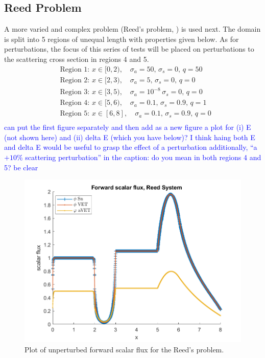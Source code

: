 \documentclass[12pt]{report}
\newcommand{\sigs}{\sigma_s}
\newcommand{\siga}{\sigma_a}
\newcommand{\comment}[2]{\marginpar{\textcolor{#2}{$\star$}}\textcolor{#2}{#1}\newline}
\newcommand{\jcr}[1]{\comment{#1}{blue}}
\newcommand{\jcr}[1]{\phantom{a}}
\begin{document}
\subsection{Reed Problem}
A more varied and complex problem (Reed's problem, \cite{buchan}) is used next. The domain is split into 5 regions of unequal length with properties given below. As for perturbations, the focus of this series of tests will be placed on 
perturbations to the scattering cross section in regions 4 and 5. 
\begin{equation*}
\begin{split}
&\text{Region 1: } x \in [0,2), \quad \siga=50, \, 			\sigs=0, \, q=50 \\
&\text{Region 2: } x \in [2,3), \quad \siga=5, \, 			\sigs=0, \, q=0 \\
&\text{Region 3: } x \in [3,5), \quad \siga=10^{-8} \,	\sigs=0, \, q=0 \\
&\text{Region 4: } x \in [5,6), \quad \siga=0.1, \, 		\sigs=0.9, \, q=1 \\
&\text{Region 5: } x \in [6,8], \quad \siga=0.1, \, 		\sigs=0.9, \, q=0\\
\end{split}
\end{equation*}
\jcr{can put the first figure separately and then add as a new figure a plot for (i) E (not shown here) and (ii) delta E (which you have below)? I think haing both E and delta E would be useful to grasp the effect of a perturbation}
\jcr{additionally, ``a $+10 \%$ scattering perturbation'' in the caption: do you mean in both regions 4 and 5? be clear}
\begin{figure}[H]
\centering
 \includegraphics[scale=0.75]{figures2/7phi.png}
 \caption{Plot of unperturbed forward scalar flux for the Reed's problem.}
\label{fig:Flux4}
\end{figure}
 
\end{document}
